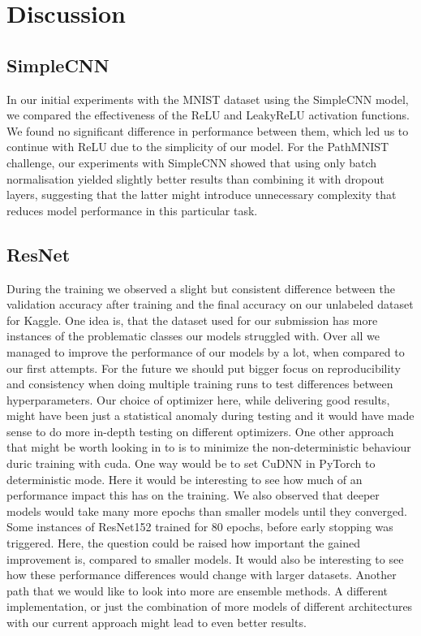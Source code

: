 \section{Discussion}\label{discussion}

\subsection{SimpleCNN}\label{SimpleCNNDiscussion}
In our initial experiments with the MNIST dataset using the SimpleCNN model, we compared the effectiveness of the ReLU and LeakyReLU activation functions. We found no significant difference in performance between them, which led us to continue with ReLU due to the simplicity of our model. For the PathMNIST challenge, our experiments with SimpleCNN showed that using only batch normalisation yielded slightly better results than combining it with dropout layers, suggesting that the latter might introduce unnecessary complexity that reduces model performance in this particular task.

\subsection{ResNet}\label{ResNetDiscussion}
During the training we observed a slight but consistent difference between the validation accuracy after training and the final accuracy on our unlabeled dataset for Kaggle. One idea is, that the dataset used for our submission has more instances of the problematic classes our models struggled with. Over all we managed to improve the performance of our models by a lot, when compared to our first attempts. For the future we should put bigger focus on reproducibility and consistency when doing multiple training runs to test differences between hyperparameters. Our choice of optimizer here, while delivering good results, might have been just a statistical anomaly during testing and it would have made sense to do more in-depth testing on different optimizers. One other approach that might be worth looking in to is to minimize the non-deterministic behaviour duric training with cuda. One way would be to set CuDNN in PyTorch to deterministic mode. Here it would be interesting to see how much of an performance impact this has on the training. We also observed that deeper models would take many more epochs than smaller models until they converged. Some instances of ResNet152 trained for 80 epochs, before early stopping was triggered. Here, the question could be raised how important the gained improvement is, compared to smaller models. It would also be interesting to see how these performance differences would change with larger datasets. Another path that we would like to look into more are ensemble methods. A different implementation, or just the combination of more models of different architectures with our current approach might lead to even better results. 

